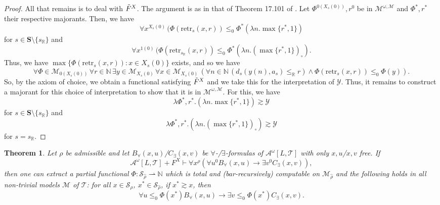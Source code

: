 \documentclass[11pt]{amsart}
\newtheorem{theorem}{Theorem}[section]
\theoremstyle{definition}
\theoremstyle{remark}
\def\NN{\mathbb{N}}
\def\RR{\mathbb{R}}
\begin{document}
\begin{proof}
All that remains is to deal with $\Tilde{F}^X$. The argument is as in that of Theorem 17.101 of \cite{Kohlenbach2008}. Let $\Phi^{0(X_s(0))}, r^0$ be in $\mathcal{M}^{\omega,\mathscr{M}}$ and $\Phi^*, r^*$ their respective majorants. Then, we have
\[
\forall x^{X_s(0)}\,(\Phi(\mathrm{retr}_s(x,r))\le_0 \Phi^*(\lambda n.\max\{r^*,1\}) 
\]
for $s \in \mathbf{S}\setminus \{s_\RR\}$
and 
\[
\forall x^{1(0)}\,(\Phi(\mathrm{retr}_{s_\RR}(x,r))\le_0 \Phi^*(\lambda n.(\max\{r^*,1\} )_\circ). 
\]
Thus, we have $\max\{\Phi(\mathrm{retr}_s(x,r)): x \in X_s(0)\}$ exists, and so we have 
\[
\forall \Phi\in \mathcal{M}_{0(X_s(0))}\,\forall r\in \NN\, \exists y \in \mathcal{M}_{X_s(0)} \,\forall x\in \mathcal{M}_{X_s(0)}\,(\forall n \in \NN\,(d_s(y(n),a_s) \le _\RR r)\land\Phi(\mathrm{retr}_s(x,r))\le_0 \Phi(y)).
\]
So, by the axiom of choice, we obtain a functional satisfying $\Tilde{F}^X$ and we take this for the interpretation of $\mathscr{Y}$. Thus, it remains to construct a majorant for this choice of interpretation to show that it is in $\mathcal{M}^{\omega,\mathscr{M}}$. For this, we have
\[
 \lambda \Phi^*,r^*.(\lambda n.\max\{r^*,1\} ) \gtrsim \mathscr{Y}
\]
for $s \in \mathbf{S} \setminus \{s_\RR\}$
and 
\[
 \lambda \Phi^*,r^*.(\lambda n.(\max\{r^*,1\})_\circ) \gtrsim \mathscr{Y}
\]
for $s = s_\RR$.

\end{proof}
 



\begin{theorem}\label{thm:metatheorem}
 Let $\rho$ be admissible and let $B_\forall(x,u)$/$C_\exists(x,v)$ be $\forall$-/$\exists$-formulas of $\mathcal{A}^\omega[L,\mathcal{T}]$ with only $x,u$/$x,v$ free. If
\[
\mathcal{A}^\omega[L,\mathcal{T}]+F^X\vdash\forall x^\rho\left(\forall u^0 B_\forall(x,u)\rightarrow\exists v^0 C_\exists(x,v)\right),
\]
then one can extract a partial functional $\Phi:\mathcal{S}_{\widehat{\rho}}\rightharpoonup\mathbb{N}$ which is total and (bar-recursively) computable on $\mathcal{M}_{\widehat{\rho}}$ and the following holds in all non-trivial models  $\mathscr{M}$ of $\mathcal{T}$: for all $x\in \mathcal{S}_\rho$, $x^*\in \mathcal{S}_{\widehat{\rho}}$, if $x^*\gtrsim x$, then
\[
\forall u\leq_0\Phi(x^*) B_\forall(x,u)\rightarrow\exists v\leq_0\Phi(x^*)C_\exists(x,v).
\]
\end{theorem}
\end{document}
